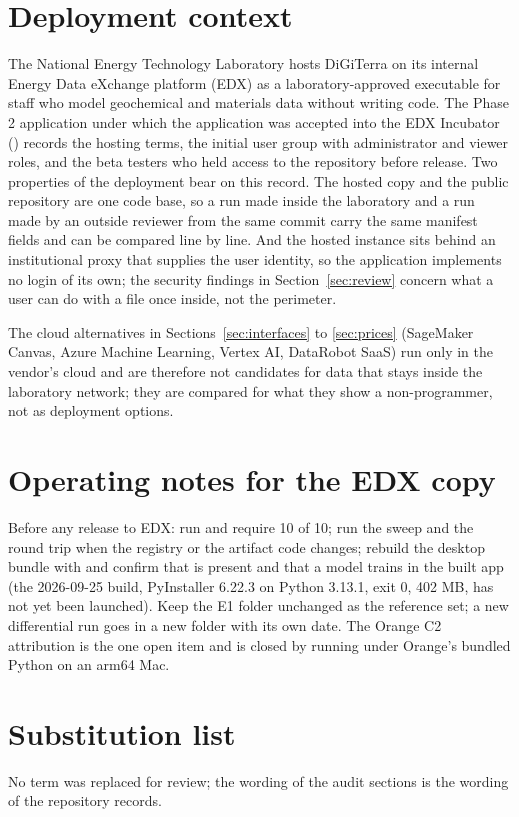 \section{Deployment context}
The National Energy Technology Laboratory hosts DiGiTerra on its internal Energy Data eXchange platform (EDX) as a laboratory-approved executable for staff who model geochemical and materials data without writing code. The Phase 2 application under which the application was accepted into the EDX Incubator () records the hosting terms, the initial user group with administrator and viewer roles, and the beta testers who held access to the repository before release. Two properties of the deployment bear on this record. The hosted copy and the public repository are one code base, so a run made inside the laboratory and a run made by an outside reviewer from the same commit carry the same manifest fields and can be compared line by line. And the hosted instance sits behind an institutional proxy that supplies the user identity, so the application implements no login of its own; the security findings in Section~\ref{sec:review} concern what a user can do with a file once inside, not the perimeter.

The cloud alternatives in Sections~\ref{sec:interfaces} to \ref{sec:prices} (SageMaker Canvas, Azure Machine Learning, Vertex AI, DataRobot SaaS) run only in the vendor's cloud and are therefore not candidates for data that stays inside the laboratory network; they are compared for what they show a non-programmer, not as deployment options.









\section{Operating notes for the EDX copy}
Before any release to EDX: run  and require 10 of 10; run the sweep and the round trip when the registry or the artifact code changes; rebuild the desktop bundle with  and confirm that  is present and that a model trains in the built app (the 2026-09-25 build, PyInstaller 6.22.3 on Python 3.13.1, exit 0, 402 MB, has not yet been launched). Keep the E1 folder unchanged as the reference set; a new differential run goes in a new folder with its own date. The Orange C2 attribution is the one open item and is closed by running  under Orange's bundled Python on an arm64 Mac.



\section*{Substitution list}
No term was replaced for review; the wording of the audit sections is the wording of the repository records.


